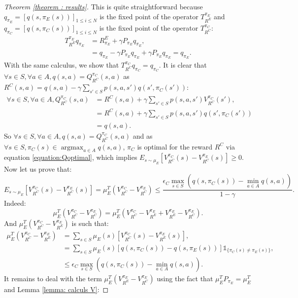 \documentclass[11pt]{article}
\newcommand{\argmax}{\operatorname*{argmax}}
\newcommand{\0}{\mathbf{0}}
\newcommand{\1}{\mathbf{1}}
\begin{document}
\begin{proof}[Theorem \ref{theorem : results}]
This is quite straightforward because $q_{\pi_E}=[q(s,\pi_E(s))]_{1\leq i\leq N}$ is the fixed point of the operator $T^{\pi_E}_{R^E}$ and  $q_{\pi_C}=[q(s,\pi_C(s))]_{1\leq i\leq N}$ is the fixed point of the operator $T^{\pi_C}_{R^C}$:
\begin{align}
T^{\pi_E}_{R^E}q_{\pi_E}&=R^E_{\pi_E}+\gamma P_{\pi_E}q_{\pi_E},
\\
&=q_{\pi_E}-\gamma P_{\pi_E}q_{\pi_E}+\gamma P_{\pi_E}q_{\pi_E}=q_{\pi_E}.
\end{align}
With the same calculus, we show that $T^{\pi_C}_{R^C}q_{\pi_C}=q_{\pi_C}$.
It is clear that $\forall s\in S,\forall a\in A, q(s,a)=Q^{\pi_C}_{R^C}(s,a)$ as $R^C(s,a)=q(s,a)-\gamma\sum_{s'\in S}p(s,a,s')q(s',\pi_C(s'))$:
\begin{align}
\forall s\in S,\forall a\in A, Q^{\pi_C}_{R^C}(s,a)&=R^C(s,a)+\gamma\sum_{s'\in S}p(s,a,s')V^{\pi_C}_{R^C}(s'),
\\
&=R^C(s,a)+\gamma\sum_{s'\in S}p(s,a,s')q(s',\pi_C(s'))
\\
&=q(s,a).
\end{align}
So $\forall s\in S,\forall a\in A, q(s,a)=Q^{\pi_C}_{R^C}(s,a)$ and as $\forall s\in S, \pi_C(s)\in\argmax_{a\in A}q(s,a)$, $\pi_C$ is optimal for the reward $R^C$ via equation \eqref{equation:Qoptimal}, which implies $E_{s\sim\mu_E}[V^{\pi_C}_{R^C}(s)-V^{\pi_E}_{R^C}(s)] \geq 0$.
Now let us prove that:
\begin{equation}
E_{s\sim\mu_E}[V^{\pi_C}_{R^C}(s)-V^{\pi_E}_{R^C}(s)]=\mu_E^T(V^{\pi_C}_{R^C}-V^{\pi_E}_{R^C})\leq\frac{\epsilon_C\max_{s\in S}(q(s,\pi_C(s))-\min_{a\in A}q(s,a))}{1-\gamma}.
\end{equation}
Indeed:
\begin{equation}
\mu_E^T(V^{\pi_C}_{R^C}-V^{\pi_E}_{R^C})=\mu_E^T(V^{\pi_C}_{R^C}-V^{\pi_E}_{R^E}+V^{\pi_E}_{R^E}-V^{\pi_E}_{R^C}).
\end{equation}
And $\mu_E^T(V^{\pi_C}_{R^C}-V^{\pi_E}_{R^E})$ is such that:
\begin{align}
\mu_E^T(V^{\pi_C}_{R^C}-V^{\pi_E}_{R^E})&=\sum_{s\in S}\mu_E(s)[V^{\pi_C}_{R^C}(s)-V^{\pi_E}_{R^E}(s)],
\\
&=\sum_{s\in S}\mu_E(s)[q(s,\pi_C(s))-q(s,\pi_E(s))]\mathds{1}_{\{\pi_C(s)\neq\pi_E(s)\}},
\\
&\leq\epsilon_C\max_{s\in S}(q(s,\pi_C(s))-\min_{a\in A}q(s,a)).
\end{align}
It remains to deal with the term $\mu_E^T(V^{\pi_E}_{R^E}-V^{\pi_E}_{R^C})$ using the fact that $\mu_E^TP_{\pi_E}=\mu_E^T$ and Lemma \ref{lemma: calculs V}:

\end{proof}
\end{document}
